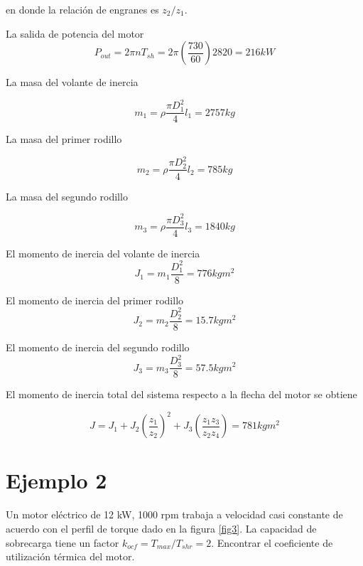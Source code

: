 \documentclass[12pt]{book}
\theoremstyle{definition}
\theoremstyle{remark}
\theoremstyle{plain}
\begin{document}
en donde la relación de engranes es $z_2/z_1$.

La salida de potencia del motor
\begin{equation}
\label{equ114}
P_{out}=2 \pi n T_{sh}= 2 \pi (\frac{730}{60}) 2820=216 kW
\end{equation}

La masa del volante de inercia

\begin{equation}
\label{equ115}
m_1=\rho \frac{\pi D_1^2}{4}l_1=2757 kg
\end{equation}

La masa del primer rodillo

\begin{equation}
\label{equ116}
m_2=\rho \frac{\pi D_2^2}{4}l_2=785 kg
\end{equation}

La masa del segundo rodillo

\begin{equation}
\label{equ117}
m_3=\rho \frac{\pi D_3^2}{4}l_3=1840 kg
\end{equation}

El momento de inercia del volante de inercia
\begin{equation}
\label{equ118}
J_1 = m_1 \frac{D_1^2}{8}= 776 kgm^2
\end{equation}

El momento de inercia del primer rodillo
\begin{equation}
\label{equ119}
J_2 = m_2 \frac{D_2^2}{8}= 15.7 kgm^2
\end{equation}

El momento de inercia del segundo rodillo
\begin{equation}
\label{equ120}
J_3 = m_3 \frac{D_3^2}{8}= 57.5 kgm^2
\end{equation}

El momento de inercia total del sistema respecto a la flecha del motor se obtiene

\begin{equation}
\label{equ121}
J= J_1+J_2 (\frac{z_1}{z_2})^2+J_3 (\frac{z_1 z_3}{z_2 z_4})= 781 kgm^2
\end{equation}

\section{Ejemplo 2}

Un motor eléctrico de 12 kW, 1000 rpm trabaja a velocidad casi constante de acuerdo con el perfil de torque dado en la figura \ref{fig3}. La capacidad de sobrecarga tiene un factor $k_{ocf}=T_{max}/T_{shr}=2$. Encontrar el coeficiente de utilización térmica del motor.
\end{document}
